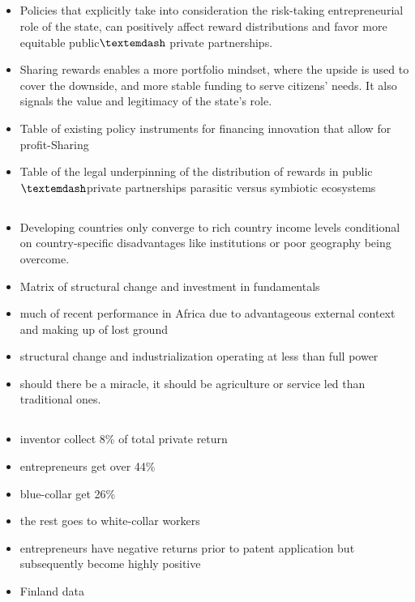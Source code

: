 \documentclass[10pt]{article} %
\begin{document}
    \subsection{\cite{LaplaneMazzucato2020}}
    \begin{itemize}
        \item Policies that explicitly take into consideration the risk-taking entrepreneurial role of the state, can positively affect reward distributions and favor more equitable public$\textemdash$ private partnerships.
        \item Sharing rewards enables a more portfolio mindset, where the upside is used to cover the downside, and more stable funding to serve citizens' needs. It also signals the value and legitimacy of the state’s role.
        \item Table of existing policy instruments for financing innovation that allow for profit-Sharing
        \item Table of the legal underpinning of the distribution of rewards in public\(\textemdash\)private partnerships parasitic versus symbiotic ecosystems
    \end{itemize}

    \subsection{\cite{Rodrik2016}}
    \begin{itemize}
        \item Developing countries only converge to rich country income levels conditional on country-specific disadvantages like institutions or poor geography being overcome.
        \item Matrix of structural change and investment in fundamentals
        \item much of recent performance in Africa due to advantageous external context and making up of lost ground
        \item structural change and industrialization operating at less than full power
        \item should there be a miracle, it should be agriculture or service led than traditional ones.
    \end{itemize}

    \subsection{\cite{AghionAkcigitHyytinenToivanen2018}}
    \begin{itemize}
        \item inventor collect 8\% of total private return
        \item entrepreneurs get over 44\%
        \item blue-collar get 26\%
        \item the rest goes to white-collar workers
        \item entrepreneurs have negative returns prior to patent application but subsequently become highly positive
        \item Finland data
    \end{itemize}
\end{document}
